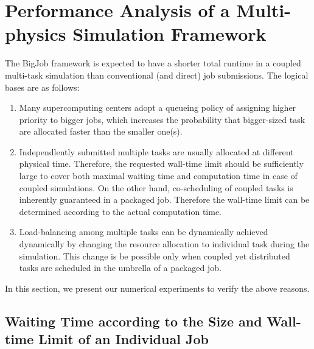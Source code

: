 \documentclass[preprint,12pt]{elsarticle}
\begin{document}
\section{Performance Analysis of a Multi-physics Simulation Framework}
\label{sec:performance}

The BigJob framework is expected to have a shorter total runtime in a coupled multi-task simulation than conventional (and direct) job submissions. The logical bases are as follows:
\begin{enumerate}
\item Many supercomputing centers adopt a queueing policy of assigning higher priority to bigger jobs, which increases the probability that bigger-sized task are allocated faster than the smaller one(s).
\item Independlently submitted multiple tasks are usually allocated at different physical time. Therefore, the requested wall-time limit should be sufficiently large to cover both maximal waiting time and computation time in case of coupled simulations. On the other hand, co-scheduling of coupled tasks is inherently guaranteed in a packaged job. Therefore the wall-time limit can be determined according to the actual computation time.
\item Load-balancing among multiple tasks can be dynamically achieved dynamically by changing the resource allocation to individual task during the simulation. This change is be possible only when coupled yet distributed tasks are scheduled in the umbrella of a packaged job.
\end{enumerate}

In this section, we present our numerical experiments to verify the above reasons.


\subsection{Waiting Time according to the Size and Wall-time Limit of an Individual Job}
\label{sec:preliminary}

\end{document}
